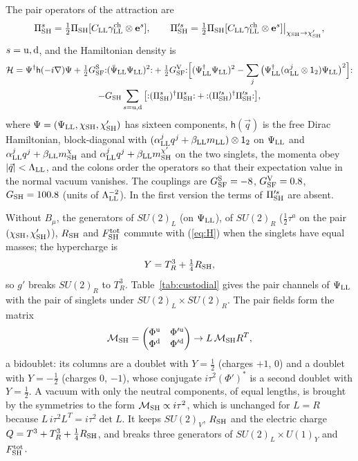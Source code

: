 \documentclass[aps,prd,onecolumn,superscriptaddress,nofootinbib,floatfix,longbibliography]{revtex4-2}
\newcommand{\LL}{{\rm LL}}
\newcommand{\SF}{{\rm SF}}
\newcommand{\SH}{{\rm SH}}
\begin{document}
The pair operators of the attraction are
\begin{equation}
\Pi^s_\SH=\tfrac12\Pi_\SH[C_\LL\gamma^{\rm ch}_\LL\otimes\mathbf e^s],\qquad \Pi'^s_\SH=\tfrac12\Pi_\SH[C_\LL\gamma^{\rm ch}_\LL\otimes\mathbf e^s]\big|_{\chi_\SH\to\chi'_\SH},
\label{eq:pairs}
\end{equation}
$s={\rm u},{\rm d}$, and the Hamiltonian density is
\begin{multline}
\mathcal H=\Psi^\dagger\mathsf h(-i\nabla)\Psi+\tfrac12G^{\rm S}_\SF{:}(\bar\Psi_\LL\Psi_\LL)^2{:}
+\tfrac12G^{\rm V}_\SF{:}\Big[(\Psi^\dagger_\LL\Psi_\LL)^2-\sum_j\big(\Psi^\dagger_\LL(\alpha^j_\LL\otimes\mathsf 1_2)\Psi_\LL\big)^2\Big]{:}\\
-G_\SH\sum_{s={\rm u},{\rm d}}\big[{:}(\Pi^s_\SH)^\dagger\Pi^s_\SH{:}+{:}(\Pi'^s_\SH)^\dagger\Pi'^s_\SH{:}\big],
\label{eq:H}
\end{multline}
where $\Psi=(\Psi_\LL,\chi_\SH,\chi'_\SH)$ has sixteen components, $\mathsf h(\vec q)$ is the free Dirac Hamiltonian,
block-diagonal with $(\alpha^j_\LL q^j+\beta_\LL m_\LL)\otimes\mathsf 1_2$ on $\Psi_\LL$ and $\alpha^j_\LL q^j+\beta_\LL m^\chi_\SH$ and
$\alpha^j_\LL q^j+\beta_\LL m^{\chi'}_\SH$ on the two singlets, the momenta obey $|\vec q|<\Lambda_\LL$, and the colons order the operators so that their expectation value in the
normal vacuum vanishes. The couplings are $G^{\rm S}_\SF=-8$, $G^{\rm V}_\SF=0.8$, $G_\SH=100.8$ (units of $\Lambda_\LL^{-2}$).
In the first version the terms of $\Pi'^s_\SH$ are absent.

Without $B_\mu$, the generators of $SU(2)_L$ (on $\Psi_\LL$), of $SU(2)_R$ ($\frac12\tau^a$ on the pair
$(\chi_\SH,\chi'_\SH)$), $R_\SH$ and $F^{\rm tot}_\SH$ commute with (\ref{eq:H}) when the singlets have equal masses; the
hypercharge is
\begin{equation}
Y=T^3_R+\tfrac14R_\SH ,
\label{eq:Y}
\end{equation}
so $g'$ breaks $SU(2)_R$ to $T^3_R$. Table~\ref{tab:custodial} gives the pair channels of $\Psi_\LL$ with the pair of singlets
under $SU(2)_L\times SU(2)_R$. The pair fields form the matrix
\begin{equation}
\mathcal M_\SH=\begin{pmatrix}\Phi^{\rm u}&\Phi'^{\rm u}\\\Phi^{\rm d}&\Phi'^{\rm d}\end{pmatrix}\to L\,\mathcal M_\SH R^T ,
\label{eq:M}
\end{equation}
a bidoublet: its columns are a doublet with $Y=\frac12$ (charges $+1$, 0) and a doublet with $Y=-\frac12$ (charges 0,
$-1$), whose conjugate $i\tau^2(\Phi')^*$ is a second doublet with $Y=\frac12$. A vacuum with only the neutral components,
of equal lengths, is brought by the symmetries to the form $\mathcal M_\SH\propto i\tau^2$, which is unchanged for $L=R$
because $L\,i\tau^2L^T=i\tau^2\det L$. It keeps $SU(2)_V$, $R_\SH$ and the electric charge
$Q=T^3+T^3_R+\frac14R_\SH$, and breaks three generators of $SU(2)_L\times U(1)_Y$ and $F^{\rm tot}_\SH$.
\end{document}
